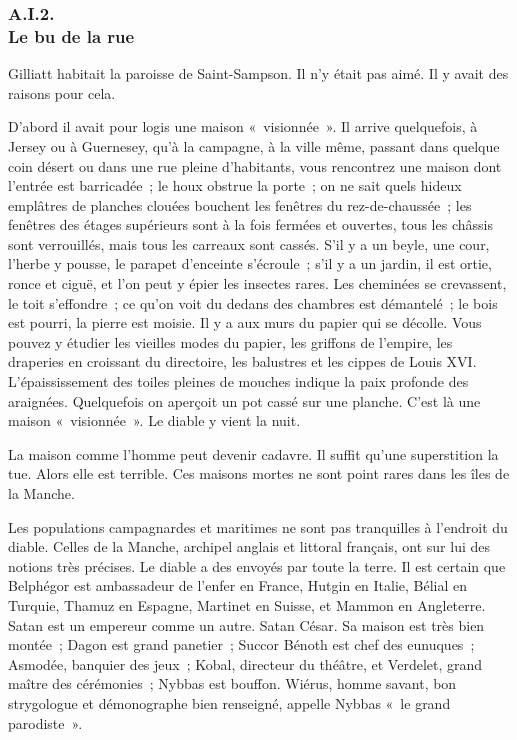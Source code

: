 \documentclass[french,twoside]{book} %
\begin{document}
 \subsubsection[{A.I.2. Le bu de la rue}]{A.I.2. \\
Le bu de la rue}
\noindent Gilliatt habitait la paroisse de Saint-Sampson. Il n’y était pas aimé. Il y avait des raisons pour cela.\par
D’abord il avait pour logis une maison « visionnée ». Il arrive quelquefois, à Jersey ou à Guernesey, qu’à la campagne, à la ville même, passant dans quelque coin désert ou dans une rue pleine d’habitants, vous rencontrez une maison dont l’entrée est barricadée ; le houx obstrue la porte ; on ne sait quels hideux emplâtres de planches clouées bouchent les fenêtres du rez-de-chaussée ; les fenêtres des étages supérieurs sont à la fois fermées et ouvertes, tous les châssis sont verrouillés, mais tous les carreaux sont cassés. S’il y a un beyle, une cour, l’herbe y pousse, le parapet d’enceinte s’écroule ; s’il y a un jardin, il est ortie, ronce et ciguë, et l’on peut y épier les insectes rares. Les cheminées se crevassent, le toit s’effondre ; ce qu’on voit du dedans des chambres est démantelé ; le bois est pourri, la pierre est moisie. Il y a aux murs du papier qui se  décolle. Vous pouvez y étudier les vieilles modes du papier, les griffons de l’empire, les draperies en croissant du directoire, les balustres et les cippes de Louis XVI. L’épaississement des toiles pleines de mouches indique la paix profonde des araignées. Quelquefois on aperçoit un pot cassé sur une planche. C’est là une maison « visionnée ». Le diable y vient la nuit.\par
La maison comme l’homme peut devenir cadavre. Il suffit qu’une superstition la tue. Alors elle est terrible. Ces maisons mortes ne sont point rares dans les îles de la Manche.\par
Les populations campagnardes et maritimes ne sont pas tranquilles à l’endroit du diable. Celles de la Manche, archipel anglais et littoral français, ont sur lui des notions très précises. Le diable a des envoyés par toute la terre. Il est certain que Belphégor est ambassadeur de l’enfer en France, Hutgin en Italie, Bélial en Turquie, Thamuz en Espagne, Martinet en Suisse, et Mammon en Angleterre. Satan est un empereur comme un autre. Satan César. Sa maison est très bien montée ; Dagon est grand panetier ; Succor Bénoth est chef des eunuques ; Asmodée, banquier des jeux ; Kobal, directeur du théâtre, et Verdelet, grand maître des cérémonies ; Nybbas est bouffon. Wiérus, homme savant, bon strygologue et démonographe bien renseigné, appelle Nybbas « le grand parodiste ».\par
\end{document}
